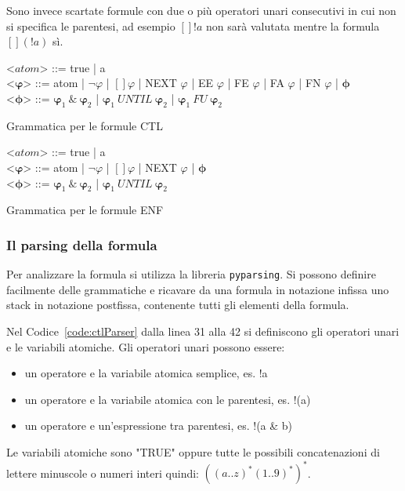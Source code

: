 \documentclass[a4paper, 10pt]{article}
\numberwithin{equation}{theor}
\begin{document}
Sono invece scartate formule con due o più operatori unari consecutivi in cui non si specifica le parentesi, ad esempio $[] !a$ non sarà valutata mentre la formula $ [] (!a)$ sì.
\begin{Grammar}
	\begin{grammar}
	\centering

  <$atom$> ::= true | a \\
  <$\boldsymbol{\varphi}$> ::= atom | $\neg \varphi$ | $[] \varphi$ | NEXT $\varphi$ | EE $\varphi$ | FE $\varphi$ | FA $\varphi$ | FN $\varphi$ | $\boldsymbol{\phi}$\\
	<$\boldsymbol{\phi}$> ::= $\boldsymbol{\varphi}_{1} \ \& \ \boldsymbol{\varphi}_{2}$ | $\boldsymbol{\varphi}_{1} \ UNTIL \ \boldsymbol{\varphi}_{2}$ | $\boldsymbol{\varphi}_{1} \ FU \ \boldsymbol{\varphi}_{2}$ \\

  \end{grammar}
	\caption{Grammatica per le formule \ac{CTL}}\label{gra:ctls}
\end{Grammar}
\begin{Grammar}
	\begin{grammar}
	\centering
  <$atom$> ::= true | a \\
  <$\boldsymbol{\varphi}$> ::= atom | $\neg \varphi$ | $[] \varphi$ | NEXT $\varphi$ | $\boldsymbol{\phi}$\\
	<$\boldsymbol{\phi}$> ::= $\boldsymbol{\varphi}_{1} \ \& \ \boldsymbol{\varphi}_{2}$ | $\boldsymbol{\varphi}_{1} \ UNTIL \ \boldsymbol{\varphi}_{2}$\\
	\end{grammar}
	\caption{Grammatica per le formule \ac{ENF}}\label{gra:enfs}
\end{Grammar}
\subsubsection{Il parsing della formula}
\label{subsub:parsingformula}
Per analizzare la formula si utilizza la libreria \texttt{pyparsing}. Si possono definire facilmente delle grammatiche e ricavare
da una formula in notazione infissa uno stack in notazione postfissa, contenente tutti gli elementi della formula.

Nel Codice~\ref{code:ctlParser} dalla linea 31 alla 42 si definiscono gli operatori unari e le variabili atomiche.
Gli operatori unari possono essere:
\begin{itemize}
  \item un operatore e la variabile atomica semplice, es. !a
  \item un operatore e la variabile atomica con le parentesi, es. !(a)
  \item un operatore e un'espressione tra parentesi, es. !(a \& b)
\end{itemize}
Le variabili atomiche sono "TRUE" oppure tutte le possibili concatenazioni di lettere minuscole o numeri interi quindi: $ ((a..z)^*(1..9)^*)^*$.
\end{document}
